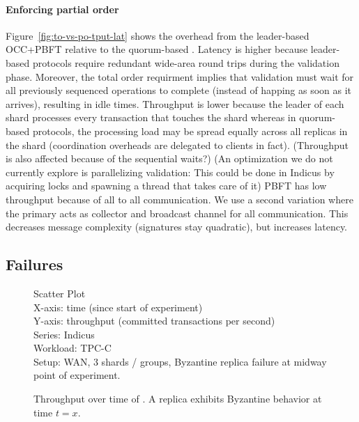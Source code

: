 \paragraph{Enforcing partial order} Figure~\ref{fig:to-vs-po-tput-lat} shows the overhead from the leader-based
OCC+PBFT relative to the quorum-based \sys{}. Latency is higher because leader-based
protocols require redundant wide-area round trips during the validation phase. Moreover, the total order requirment implies that validation must wait for all previously sequenced operations to complete (instead of happing as soon as it arrives), resulting in idle times.
Throughput is lower because the leader of each shard processes every transaction
that touches the shard whereas in quorum-based protocols, the processing load 
may be spread equally across all replicas in the shard (coordination overheads are delegated to clients in fact). (Throughput is also affected because of the sequential waits?)
(An optimization we do not currently explore is parallelizing validation: This could be done in Indicus by acquiring locks and spawning a thread that takes care of it)
PBFT has low throughput because of all to all communication. We use a second variation where the primary acts as collector and broadcast channel for all communication. This decreases message complexity (signatures stay quadratic), but increases latency.

\subsection{Failures}

\begin{figure}
  Scatter Plot\\
  X-axis: time (since start of experiment)\\
  Y-axis: throughput (committed transactions per second)\\
  Series: Indicus\\
  Workload: TPC-C\\
  Setup: WAN, 3 shards / groups, Byzantine replica failure at midway point of
  experiment.\\
  \caption{Throughput over time of \sys{}. A replica exhibits Byzantine
  behavior at time $t=x$.}
  \label{fig:failure-replica-tot}
\end{figure}

